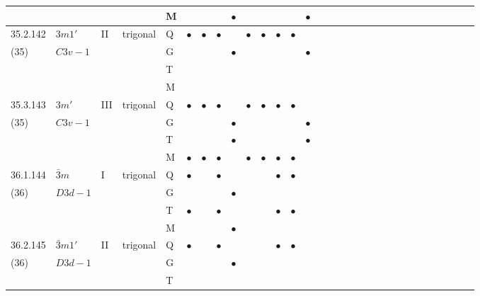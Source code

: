 \documentclass[fleqn,9pt,landscape]{jsarticle}
\begin{document}
\begin{longtable}{lllll|l|l|l|l|l|l|l|l|l|ll|ll|ll|ll|ll|ll|ll|ll}
 &  &  &  & M &  &  &  & $\bullet$ &  &  &  &  & $\bullet$ &  &  &  &  &  &  &  &  &  &  &  &  &  &  &  &  \\ \hline
35.2.142 & \texttt{$3m1'$} & II & trigonal & Q & $\bullet$ & $\bullet$ & $\bullet$ &  & $\bullet$ & $\bullet$ & $\bullet$ & $\bullet$ &  &  &  &  &  &  &  &  &  &  &  &  &  &  &  &  &  \\
(35) & $C3v-1$ &  &  & G &  &  &  & $\bullet$ &  &  &  &  & $\bullet$ &  &  &  &  &  &  &  &  &  &  &  &  &  &  &  &  \\
 &  &  &  & T &  &  &  &  &  &  &  &  &  &  &  &  &  &  &  &  &  &  &  &  &  &  &  &  &  \\
 &  &  &  & M &  &  &  &  &  &  &  &  &  &  &  &  &  &  &  &  &  &  &  &  &  &  &  &  &  \\ \hline
35.3.143 & \texttt{$3m'$} & III & trigonal & Q & $\bullet$ & $\bullet$ & $\bullet$ &  & $\bullet$ & $\bullet$ & $\bullet$ & $\bullet$ &  &  &  &  &  &  &  &  &  &  &  &  &  &  &  &  &  \\
(35) & $C3v-1$ &  &  & G &  &  &  & $\bullet$ &  &  &  &  & $\bullet$ &  &  &  &  &  &  &  &  &  &  &  &  &  &  &  &  \\
 &  &  &  & T &  &  &  & $\bullet$ &  &  &  &  & $\bullet$ &  &  &  &  &  &  &  &  &  &  &  &  &  &  &  &  \\
 &  &  &  & M & $\bullet$ & $\bullet$ & $\bullet$ &  & $\bullet$ & $\bullet$ & $\bullet$ & $\bullet$ &  &  &  &  &  &  &  &  &  &  &  &  &  &  &  &  &  \\ \hline
36.1.144 & \texttt{$\bar{3}m$} & I & trigonal & Q & $\bullet$ &  & $\bullet$ &  &  &  & $\bullet$ & $\bullet$ &  &  &  &  &  &  &  &  &  &  &  &  &  &  &  &  &  \\
(36) & $D3d-1$ &  &  & G &  &  &  & $\bullet$ &  &  &  &  &  &  &  &  &  &  &  &  &  &  &  &  &  &  &  &  &  \\
 &  &  &  & T & $\bullet$ &  & $\bullet$ &  &  &  & $\bullet$ & $\bullet$ &  &  &  &  &  &  &  &  &  &  &  &  &  &  &  &  &  \\
 &  &  &  & M &  &  &  & $\bullet$ &  &  &  &  &  &  &  &  &  &  &  &  &  &  &  &  &  &  &  &  &  \\ \hline
36.2.145 & \texttt{$\bar{3}m1'$} & II & trigonal & Q & $\bullet$ &  & $\bullet$ &  &  &  & $\bullet$ & $\bullet$ &  &  &  &  &  &  &  &  &  &  &  &  &  &  &  &  &  \\
(36) & $D3d-1$ &  &  & G &  &  &  & $\bullet$ &  &  &  &  &  &  &  &  &  &  &  &  &  &  &  &  &  &  &  &  &  \\
 &  &  &  & T &  &  &  &  &  &  &  &  &  &  &  &  &  &  &  &  &  &  &  &  &  &  &  &  &  \\

\end{longtable}
\end{document}
